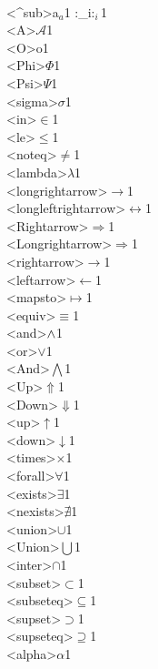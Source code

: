 {    {\\<^sub>a}{{$_a$}}1
    {:_i}{{$:_i$}}1
    {\\<A>}{{$\mathcal{A}$}}1
    {\\<O>}{{\sf o}}1
    {\\<Phi>}{{$\Phi$}}1
    {\\<Psi>}{{$\Psi$}}1
    {\\<sigma>}{{$\sigma$}}1
    {\\<in>}{{$\in$}}1
    {\\<le>}{{$\le$}}1
    {\\<noteq>}{{$\ne$}}1
    {\\<lambda>}{{$\lambda$}}1
    {\\<longrightarrow>}{{$\longrightarrow$}}1
    {\\<longleftrightarrow>}{{$\longleftrightarrow$}}1
    {\\<Rightarrow>}{{$\Rightarrow$}}1
    {\\<Longrightarrow>}{{$\Longrightarrow$}}1
    {\\<rightarrow>}{{$\rightarrow$}}1
    {\\<leftarrow>}{{$\leftarrow$}}1
    {\\<mapsto>}{{$\mapsto$}}1
    {\\<equiv>}{{$\equiv$}}1
    {\\<and>}{{$\land$}}1
    {\\<or>}{{$\vee$}}1
    {\\<And>}{{$\bigwedge$}}1
    {\\<Up>}{{$\Uparrow$}}1
    {\\<Down>}{{$\Downarrow$}}1
    {\\<up>}{{$\uparrow$}}1
    {\\<down>}{{$\downarrow$}}1
    {\\<times>}{{$\times$}}1
    {\\<forall>}{{$\forall$}}1
    {\\<exists>}{{$\exists$}}1
    {\\<nexists>}{{$\nexists$}}1
    {\\<union>}{{$\cup$}}1
    {\\<Union>}{{$\bigcup$}}1
    {\\<inter>}{{$\cap$}}1
    {\\<subset>}{{$\subset$}}1
    {\\<subseteq>}{{$\subseteq$}}1
    {\\<supset>}{{$\supset$}}1
    {\\<supseteq>}{{$\supseteq$}}1
    {\\<alpha>}{{$\alpha$}}1
}
